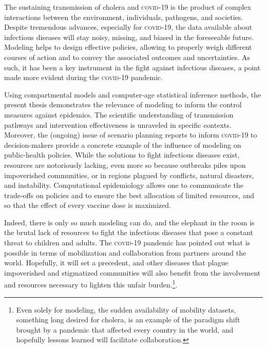 The sustaining transmission of cholera and \textsc{covid}-19 is the product of complex interactions between the environment, individuals, pathogens, and societies. Despite tremendous advances, especially for \textsc{covid}-19, the data available about infectious diseases will stay noisy, missing, and biased in the foreseeable future. Modeling helps to design effective policies, allowing to properly weigh different courses of action and to convey the associated outcomes and uncertainties. As such, it has been a key instrument in the fight against infectious diseases, a point made more evident during the \textsc{covid}-19 pandemic. 

Using compartmental models and computer-age statistical inference methods, the present thesis demonstrates the relevance of modeling to inform the control measures against epidemics. The scientific understanding of transmission pathways and intervention effectiveness is unraveled in specific contexts. Moreover, the (ongoing) issue of scenario planning reports to inform \textsc{covid}-19 to decision-makers provide a concrete example of the influence of modeling on public-health policies. 
While the solutions to fight infectious diseases exist, resources are notoriously lacking, even more so because outbreaks piles upon impoverished communities, or in regions plagued by conflicts, natural disasters, and instability. Computational epidemiology allows one to communicate the trade-offs on policies and to ensure the best allocation of limited resources, and so that \eg the effect of every vaccine dose is maximized. %

Indeed, there is only so much modeling can do, and the elephant in the room is the brutal lack of resources to fight the infectious diseases that pose a constant threat to children and adults. The \textsc{covid}-19 pandemic has pointed out what is possible in terms of mobilization and collaboration from partners around the world. Hopefully, it will set a precedent, and other diseases that plague impoverished and stigmatized communities will also benefit from the involvement and resources necessary to lighten this unfair burden.\footnote[][-2\baselineskip]{Even solely for modeling, the sudden availability of mobility datasets, something long desired for cholera, is an example of the paradigm shift brought by a pandemic that affected every country in the world, and hopefully lessons learned will facilitate collaboration.}.

